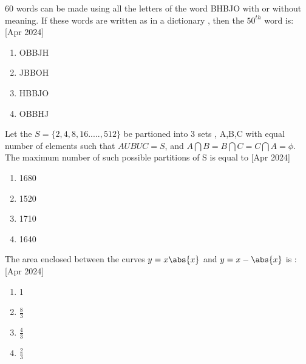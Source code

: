 \iffalse
  \title{2024}
  \author{ai24btech11005}
  \section{mcq-single}
\fi



    \item 60 words can be made using all the letters of the word BHBJO with or without meaning. If these words are written as in a dictionary , then the $50^{th}$ word is:
    \hfill{[Apr 2024]}
        \begin{multicols}{4}
            \begin{enumerate}
                \item OBBJH
                \item JBBOH
                \item HBBJO
                \item OBBHJ
            \end{enumerate}
        \end{multicols}

    \item Let the $S=\{2,4,8,16.....,512\}$ be partioned into 3 sets , A,B,C with equal number of elements such that $AUBUC=S$, and $A \bigcap B=B \bigcap C=C \bigcap A=\phi$. The maximum number of such possible partitions of S is equal to
     \hfill{[Apr 2024]}


		\begin{multicols}{4}
			\begin{enumerate}
				\item 1680
				\item  1520
				\item 1710
				\item  1640
			\end{enumerate}
		\end{multicols}

    \item The area enclosed between the curves $y=x\abs{x}$ and $y=x-\abs{x}$ is  :
      \hfill{[Apr 2024]}
        \begin{multicols}{4}
            \begin{enumerate}
              \item 1
              \item $\frac{8}{3}$
              \item $\frac{4}{3}$
              \item $\frac{2}{3}$
            \end{enumerate}
        \end{multicols}

